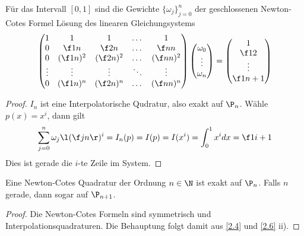 \documentclass[11pt]{scrbook}
\begin{document}
\begin{st}
	\label{2.10}
	Für das Intervall $[0,1]$ sind die Gewichte $\{\omega_j\}_{j=0}^n$ der geschlossenen Newton-Cotes Formel Lösung des linearen Gleichungsystems
	\[
		\begin{pmatrix}
			1 & 1 & 1 & \dotsc & 1 \\
			0 & \f 1n & \f 2n & \dotsc & \f nn \\
			0 & (\f 1n)^2 & (\f 2n)^2 & \dotsc & (\f nn)^2 \\
			\vdots & \vdots & \vdots & \ddots & \vdots \\
			0 & (\f 1n)^n & (\f 2n)^n & \dotsc & (\f nn)^n \\
		\end{pmatrix}
		\begin{pmatrix}
			\omega_0 \\
			\vdots \\
			\omega_n
		\end{pmatrix}
		=
		\begin{pmatrix}
			1 \\ \f 12 \\ \vdots \\ \f 1{n+1}
		\end{pmatrix}
	\]
	\begin{proof}
		$I_n$ ist eine Interpolatorische Qudratur, also exakt auf $\P_n$.
		Wähle $p(x) = x^i$, dann gilt
		\[
			\sum_{j=0}^n \omega_j \l( \f jn \r)^i = I_n(p) = I(p) = I(x^i) = \int_0^1 x^i dx = \f 1{i+1}
		\]
		Dies ist gerade die $i$-te Zeile im System.
	\end{proof}
\end{st}

\begin{kor}
	\label{2.11}
	Eine Newton-Cotes Quadratur der Ordnung $n\in \N$ ist exakt auf $\P_n$.
	Falls $n$ gerade, dann sogar auf $\P_{n+1}$.
	\begin{proof}
		Die Newton-Cotes Formeln sind symmetrisch und Interpolationsquadraturen.
		Die Behauptung folgt damit aus \ref{2.4} und \ref{2.6} ii).
	\end{proof}
\end{kor}
\end{document}
